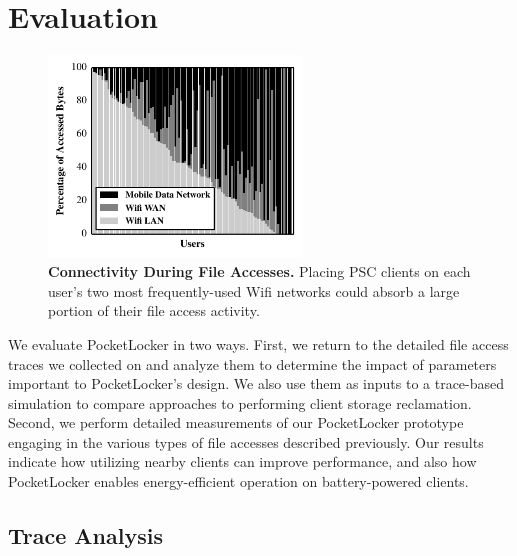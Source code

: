 
\section{Evaluation}
\label{sec-evaluation}

\begin{figure}

  \vspace*{-0.6in}

  \includegraphics[width=0.6\textwidth]{./figures/pocketlocker/ConnectivityPercentageGraph.pdf}
  
  \vspace*{-0.1in}

  \caption{\small \textbf{Connectivity During File Accesses.} Placing PSC
    clients on each user's two most frequently-used Wifi networks could absorb a
  large portion of their file access activity.}
  
  \vspace*{-0.2in}

  \label{fig-simulation-connectivity}

\end{figure}

We evaluate PocketLocker in two ways. First, we return to the detailed file
access traces we collected on \PhoneLab{} and analyze them to determine the
impact of parameters important to PocketLocker's design. We also use them as
inputs to a trace-based simulation to compare approaches to performing client
storage reclamation. Second, we perform detailed measurements of our
PocketLocker prototype engaging in the various types of file accesses
described previously. Our results indicate how utilizing nearby clients can
improve performance, and also how PocketLocker enables energy-efficient
operation on battery-powered clients.

\subsection{Trace Analysis}
\label{subsec-evaluation-traces}

